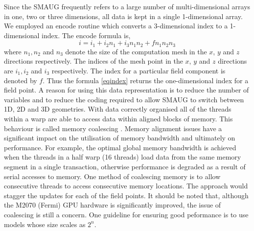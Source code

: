Since the SMAUG frequently refers to a large number of multi-dimensional arrays in one, two or three dimensions, all data is kept in a single 1-dimensional array. We employed an encode routine which converts a 3-dimensional index to a 1-dimensional index. The encode formula is,
\begin{equation}\label{eqindex}
i=i_{1}+i_{2}n_{1}+i_{3}n_{1}n_{2}+f n_{1} n_{2} n_{3}
\end{equation}
where $n_{1},n_{2}$ and $n_{3}$  denote the size of the computation mesh in the $x$, $y$ and $z$ directions respectively. The indices of the mesh point in the  $x$, $y$ and $z$ directions are $i_{1}, i_{2}$ and $i_{3}$ respectively. The index for a particular field component is denoted by  ${f}$. Thus the formula \eqref{eqindex} returns the one-dimensional index for a field point.  A reason for using this data representation is to reduce the number of variables and to reduce the coding required to allow SMAUG to switch between 1D,  2D and 3D geometries.
 With data correctly organised all of the threads within a warp are able to access data within aligned blocks of memory. This behaviour is called memory coalescing \citep{Farber2011}. Memory alignment issues have a significant impact on the utilisation of memory bandwidth and ultimately on performance. For example, the optimal global memory bandwidth is achieved when the threads in a half warp (16 threads) load data from the same memory segment in a single transaction, otherwise performance is degraded as a result of serial accesses to memory. One method of coalescing memory is to allow consecutive threads to access consecutive memory locations. The approach would stagger the updates for each of the field points. It should be noted that, although the M2070 (Fermi) GPU hardware is significantly improved, the issue of coalescing is still a concern. One guideline for ensuring good peformance is to use models whose size scales  as $2^{n}$.




